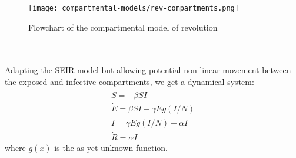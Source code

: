 \begin{figure}[h]
	\centering
	\texttt{[image: compartmental-models/rev-compartments.png]}
	\caption{Flowchart of the compartmental model of revolution}
\end{figure}\\
\\
Adapting the SEIR model but allowing potential non-linear movement between the exposed and infective compartments, we get a dynamical system:
\begin{eqnarray}
\dot S=-\beta S I\\
\dot E=\beta S I- \gamma E g(I/N)\\
\dot I= \gamma E g(I/N)-\alpha I\\
\dot R=\alpha I
\end{eqnarray}
where $g(x)$ is the as yet unknown function.
